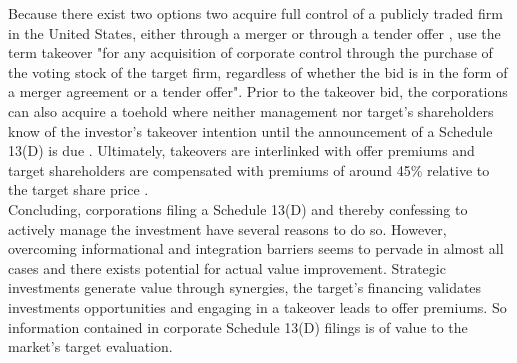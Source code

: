 \documentclass[12pt]{article}
\begin{document}
Because there exist two options two acquire full control of a publicly traded firm in the United States, either through a merger or through a tender offer \citep[p.2]{Offenberg2015}, \citet[p.1]{Betton2008} use the term takeover "for any acquisition of corporate control through the purchase of the voting stock of the target firm, regardless of whether the bid is in the form of a merger agreement or a tender offer".
Prior to the takeover bid, the corporations can also acquire a toehold where neither management nor target's shareholders know of the investor's takeover intention until the announcement of a Schedule 13(D) is due \citet[p.158]{Eckbo2009}. Ultimately, takeovers are interlinked with offer premiums and target shareholders are compensated with premiums of around 45\% relative to the target share price \citep[p.154]{Eckbo2009}.\\
Concluding, corporations filing a Schedule 13(D) and thereby confessing to actively manage the investment have several reasons to do so. However, overcoming informational and integration barriers seems to pervade in almost all cases and there exists potential for actual value improvement. Strategic investments generate value through synergies, the target's financing validates investments opportunities and engaging in a takeover leads to offer premiums. So information contained in corporate Schedule 13(D) filings is of value to the market's target evaluation. 
\end{document}
